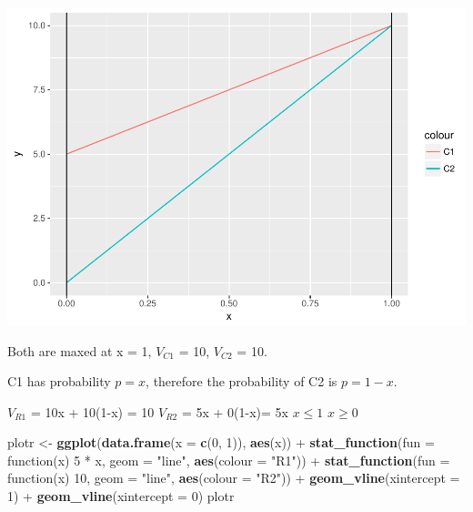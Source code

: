 \documentclass[]{article}
\newenvironment{Shaded}{\begin{snugshade}}{\end{snugshade}}
\newcommand{\KeywordTok}[1]{\textcolor[rgb]{0.13,0.29,0.53}{\textbf{{#1}}}}
\newcommand{\DataTypeTok}[1]{\textcolor[rgb]{0.13,0.29,0.53}{{#1}}}
\newcommand{\DecValTok}[1]{\textcolor[rgb]{0.00,0.00,0.81}{{#1}}}
\newcommand{\StringTok}[1]{\textcolor[rgb]{0.31,0.60,0.02}{{#1}}}
\newcommand{\NormalTok}[1]{{#1}}
\begin{document}
\includegraphics{Christophe_Hunt_hw9_files/figure-latex/unnamed-chunk-3-1.pdf}

Both are maxed at x = 1, \(V_{C1}\) = 10, \(V_{C2}\) = 10.

C1 has probability \(p = x\), therefore the probability of C2 is
\(p=1-x\).

\(V_{R1}\) = 10x + 10(1-x) = 10 \(V_{R2}\) = 5x + 0(1-x)= 5x
\(x \leq 1\) \(x \geq 0\)

\begin{Shaded}
\begin{Highlighting}[]
\NormalTok{plotr <-}\StringTok{ }\KeywordTok{ggplot}\NormalTok{(}\KeywordTok{data.frame}\NormalTok{(}\DataTypeTok{x =} \KeywordTok{c}\NormalTok{(}\DecValTok{0}\NormalTok{, }\DecValTok{1}\NormalTok{)), }\KeywordTok{aes}\NormalTok{(x)) +}\StringTok{ }\KeywordTok{stat_function}\NormalTok{(}\DataTypeTok{fun =} \NormalTok{function(x) }\DecValTok{5} \NormalTok{*}\StringTok{ }
\StringTok{    }\NormalTok{x, }\DataTypeTok{geom =} \StringTok{"line"}\NormalTok{, }\KeywordTok{aes}\NormalTok{(}\DataTypeTok{colour =} \StringTok{"R1"}\NormalTok{)) +}\StringTok{ }\KeywordTok{stat_function}\NormalTok{(}\DataTypeTok{fun =} \NormalTok{function(x) }\DecValTok{10}\NormalTok{, }
    \DataTypeTok{geom =} \StringTok{"line"}\NormalTok{, }\KeywordTok{aes}\NormalTok{(}\DataTypeTok{colour =} \StringTok{"R2"}\NormalTok{)) +}\StringTok{ }\KeywordTok{geom_vline}\NormalTok{(}\DataTypeTok{xintercept =} \DecValTok{1}\NormalTok{) +}\StringTok{ }\KeywordTok{geom_vline}\NormalTok{(}\DataTypeTok{xintercept =} \DecValTok{0}\NormalTok{)}
\NormalTok{plotr}
\end{Highlighting}
\end{Shaded}
\end{document}

